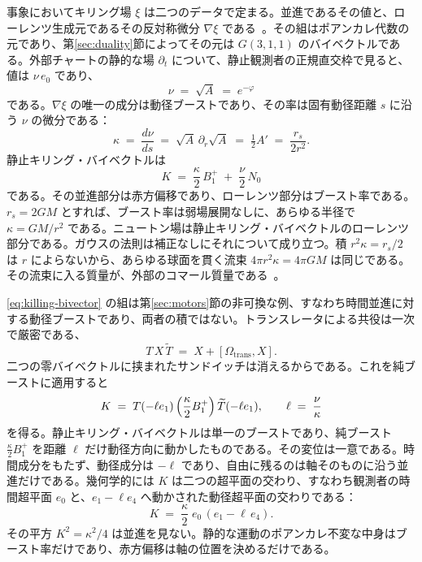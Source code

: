 \documentclass[a4paper]{article}
\begin{document}
事象においてキリング場 \(\xi\) は二つのデータで定まる。並進であるその値と、ローレンツ生成元であるその反対称微分 \(\nabla\xi\) である~\cite{Wald1984}。その組はポアンカレ代数の元であり、第\ref{sec:duality}節によってその元は \(G(3,1,1)\) のバイベクトルである。外部チャートの静的な場 \(\partial_{t}\) について、静止観測者の正規直交枠で見ると、値は \(\nu\,e_{0}\) であり、
\[
\nu \;=\; \sqrt{A} \;=\; e^{-\varphi}
\]
である。\(\nabla\xi\) の唯一の成分は動径ブーストであり、その率は固有動径距離 \(s\) に沿う \(\nu\) の微分である：
\[
\kappa \;=\; \frac{d\nu}{ds} \;=\; \sqrt{A}\,\partial_{r}\sqrt{A} \;=\; \tfrac12 A' \;=\; \frac{r_{s}}{2r^{2}}.
\]
静止キリング・バイベクトルは
\begin{equation}
K \;=\; \frac{\kappa}{2}\,B^{+}_{1} \;+\; \frac{\nu}{2}\,N_{0}
\label{eq:killing-bivector}
\end{equation}
である。その並進部分は赤方偏移であり、ローレンツ部分はブースト率である。\(r_{s}=2GM\) とすれば、ブースト率は弱場展開なしに、あらゆる半径で \(\kappa=GM/r^{2}\) である。ニュートン場は静止キリング・バイベクトルのローレンツ部分である。ガウスの法則は補正なしにそれについて成り立つ。積 \(r^{2}\kappa=r_{s}/2\) は \(r\) によらないから、あらゆる球面を貫く流束 \(4\pi r^{2}\kappa=4\pi GM\) は同じである。その流束に入る質量が、外部のコマール質量である~\cite{Komar1959}。

\eqref{eq:killing-bivector} の組は第\ref{sec:motors}節の非可換な例、すなわち時間並進に対する動径ブーストであり、両者の積ではない。トランスレータによる共役は一次で厳密である、
\[
T\,X\,\widetilde{T} \;=\; X + [\Omega_{\mathrm{trans}},X].
\]
二つの零バイベクトルに挟まれたサンドイッチは消えるからである。これを純ブーストに適用すると
\begin{equation}
K \;=\; T(-\ell e_{1})\,\Bigl(\frac{\kappa}{2}B^{+}_{1}\Bigr)\,\widetilde{T}(-\ell e_{1}),
\qquad
\ell \;=\; \frac{\nu}{\kappa}
\label{eq:displaced-boost}
\end{equation}
を得る。静止キリング・バイベクトルは単一のブーストであり、純ブースト \(\tfrac{\kappa}{2}B^{+}_{1}\) を距離 \(\ell\) だけ動径方向に動かしたものである。その変位は一意である。時間成分をもたず、動径成分は \(-\ell\) であり、自由に残るのは軸そのものに沿う並進だけである。幾何学的には \(K\) は二つの超平面の交わり、すなわち観測者の時間超平面 \(e_{0}\) と、\(e_{1}-\ell e_{4}\) へ動かされた動径超平面の交わりである：
\[
K \;=\; \frac{\kappa}{2}\;e_{0}\,(e_{1}-\ell\,e_{4}).
\]
その平方 \(K^{2}=\kappa^{2}/4\) は並進を見ない。静的な運動のポアンカレ不変な中身はブースト率だけであり、赤方偏移は軸の位置を決めるだけである。
\end{document}

